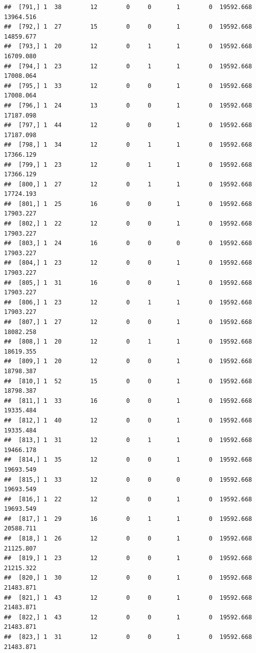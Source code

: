 \documentclass[
]{article}
\begin{document}
\begin{verbatim}
##  [791,] 1  38        12        0     0       1        0  19592.668  13964.516
##  [792,] 1  27        15        0     0       1        0  19592.668  14859.677
##  [793,] 1  20        12        0     1       1        0  19592.668  16709.080
##  [794,] 1  23        12        0     1       1        0  19592.668  17008.064
##  [795,] 1  33        12        0     0       1        0  19592.668  17008.064
##  [796,] 1  24        13        0     0       1        0  19592.668  17187.098
##  [797,] 1  44        12        0     0       1        0  19592.668  17187.098
##  [798,] 1  34        12        0     1       1        0  19592.668  17366.129
##  [799,] 1  23        12        0     1       1        0  19592.668  17366.129
##  [800,] 1  27        12        0     1       1        0  19592.668  17724.193
##  [801,] 1  25        16        0     0       1        0  19592.668  17903.227
##  [802,] 1  22        12        0     0       1        0  19592.668  17903.227
##  [803,] 1  24        16        0     0       0        0  19592.668  17903.227
##  [804,] 1  23        12        0     0       1        0  19592.668  17903.227
##  [805,] 1  31        16        0     0       1        0  19592.668  17903.227
##  [806,] 1  23        12        0     1       1        0  19592.668  17903.227
##  [807,] 1  27        12        0     0       1        0  19592.668  18082.258
##  [808,] 1  20        12        0     1       1        0  19592.668  18619.355
##  [809,] 1  20        12        0     0       1        0  19592.668  18798.387
##  [810,] 1  52        15        0     0       1        0  19592.668  18798.387
##  [811,] 1  33        16        0     0       1        0  19592.668  19335.484
##  [812,] 1  40        12        0     0       1        0  19592.668  19335.484
##  [813,] 1  31        12        0     1       1        0  19592.668  19466.178
##  [814,] 1  35        12        0     0       1        0  19592.668  19693.549
##  [815,] 1  33        12        0     0       0        0  19592.668  19693.549
##  [816,] 1  22        12        0     0       1        0  19592.668  19693.549
##  [817,] 1  29        16        0     1       1        0  19592.668  20588.711
##  [818,] 1  26        12        0     0       1        0  19592.668  21125.807
##  [819,] 1  23        12        0     0       1        0  19592.668  21215.322
##  [820,] 1  30        12        0     0       1        0  19592.668  21483.871
##  [821,] 1  43        12        0     0       1        0  19592.668  21483.871
##  [822,] 1  43        12        0     0       1        0  19592.668  21483.871
##  [823,] 1  31        12        0     0       1        0  19592.668  21483.871

\end{verbatim}
\end{document}
